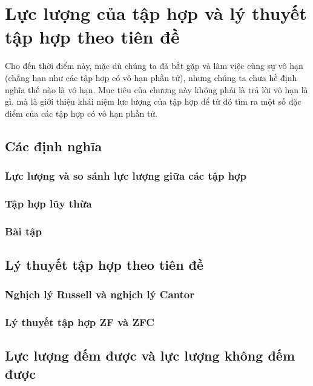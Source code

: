 \chapter{Lực lượng của tập hợp và lý thuyết tập hợp theo tiên đề}\label{chapter:cardinality-and-axiomatic-set-theory}

Cho đến thời điểm này, mặc dù chúng ta đã bắt gặp và làm việc cùng sự vô hạn (chẳng hạn như các tập hợp có vô hạn phần tử), nhưng chúng ta chưa hề định nghĩa thế nào là vô hạn. Mục tiêu của chương này không phải là trả lời vô hạn là gì, mà là giới thiệu khái niệm lực lượng của tập hợp để từ đó tìm ra một số đặc điểm của các tập hợp có vô hạn phần tử.

\section{Các định nghĩa}

\subsection{Lực lượng và so sánh lực lượng giữa các tập hợp}

\subsection{Tập hợp lũy thừa}

\subsection{Bài tập}

\section{Lý thuyết tập hợp theo tiên đề}

\subsection{Nghịch lý Russell và nghịch lý Cantor}

\subsection{Lý thuyết tập hợp ZF và ZFC}

\section{Lực lượng đếm được và lực lượng không đếm được}

